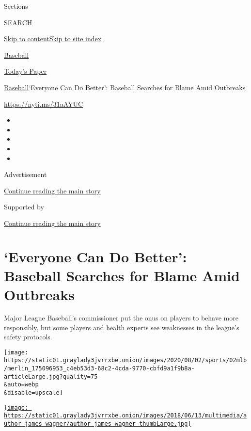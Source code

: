 Sections

SEARCH

\protect\hyperlink{site-content}{Skip to
content}\protect\hyperlink{site-index}{Skip to site index}

\href{https://www.nytimes3xbfgragh.onion/section/sports/baseball}{Baseball}

\href{https://myaccount.nytimes3xbfgragh.onion/auth/login?response_type=cookie\&client_id=vi}{}

\href{https://www.nytimes3xbfgragh.onion/section/todayspaper}{Today's
Paper}

\href{/section/sports/baseball}{Baseball}\textbar{}`Everyone Can Do
Better': Baseball Searches for Blame Amid Outbreaks

\url{https://nyti.ms/31aAYUC}

\begin{itemize}
\item
\item
\item
\item
\item
\end{itemize}

Advertisement

\protect\hyperlink{after-top}{Continue reading the main story}

Supported by

\protect\hyperlink{after-sponsor}{Continue reading the main story}

\hypertarget{everyone-can-do-better-baseball-searches-for-blame-amid-outbreaks}{%
\section{`Everyone Can Do Better': Baseball Searches for Blame Amid
Outbreaks}\label{everyone-can-do-better-baseball-searches-for-blame-amid-outbreaks}}

Major League Baseball's commissioner put the onus on players to behave
more responsibly, but some players and health experts see weaknesses in
the league's safety protocols.

\texttt{[image: https://static01.graylady3jvrrxbe.onion/images/2020/08/02/sports/02mlb/merlin\_175096953\_c4eb53d3-68c2-4cda-9770-cbfd9a1f9b8a-articleLarge.jpg?quality=75\\\&auto=webp\\\&disable=upscale]}

\href{https://www.nytimes3xbfgragh.onion/by/james-wagner}{\texttt{[image: https://static01.graylady3jvrrxbe.onion/images/2018/06/13/multimedia/author-james-wagner/author-james-wagner-thumbLarge.jpg]}}

